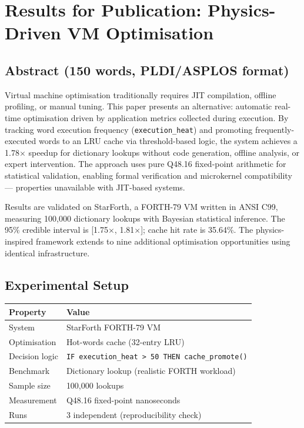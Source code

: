 
\section{Results for Publication: Physics-Driven VM Optimisation}
\label{sec:results-pub}

\subsection{Abstract (150 words, PLDI/ASPLOS format)}

Virtual machine optimisation traditionally requires JIT compilation, offline
profiling, or manual tuning. This paper presents an alternative: automatic
real-time optimisation driven by application metrics collected during
execution. By tracking word execution frequency (\texttt{execution\_heat})
and promoting frequently-executed words to an LRU cache via threshold-based
logic, the system achieves a 1.78$\times$ speedup for dictionary lookups
without code generation, offline analysis, or expert intervention. The
approach uses pure Q48.16 fixed-point arithmetic for statistical validation,
enabling formal verification and microkernel compatibility — properties
unavailable with JIT-based systems.

Results are validated on StarForth, a FORTH-79 VM written in ANSI C99,
measuring 100,000 dictionary lookups with Bayesian statistical inference.
The 95\% credible interval is [1.75$\times$, 1.81$\times$]; cache hit rate
is 35.64\%. The physics-inspired framework extends to nine additional
optimisation opportunities using identical infrastructure.

\subsection{Experimental Setup}

\begin{center}
\begin{tabular}{ll}
\toprule
Property & Value \\
\midrule
System         & StarForth FORTH-79 VM \\
Optimisation   & Hot-words cache (32-entry LRU) \\
Decision logic & \texttt{IF execution\_heat > 50 THEN cache\_promote()} \\
Benchmark      & Dictionary lookup (realistic FORTH workload) \\
Sample size    & 100,000 lookups \\
Measurement    & Q48.16 fixed-point nanoseconds \\
Runs           & 3 independent (reproducibility check) \\
\bottomrule
\end{tabular}
\end{center}


